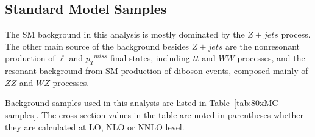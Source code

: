 \subsection{Standard Model Samples}
The SM background in this analysis is mostly dominated by the $Z+jets$ process. The other main source of the background besides $Z+jets$ are the nonresonant production of $\ell$ and ${p_{T}}^{miss}$ final states, including $t\bar{t}$ and $WW$ processes, and the resonant background from SM production of diboson events, composed mainly of $ZZ$ and $WZ$ processes. 

\vspace{0.3cm}
Background samples used in this analysis are listed in Table~\ref{tab:80xMC-samples}.
The cross-section values in the table are noted in parentheses whether they are
calculated at LO, NLO or NNLO level.

